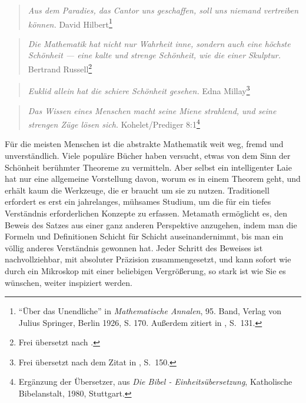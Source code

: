\begin{quote}
  {\em Aus dem Paradies, das Cantor uns geschaffen, soll uns niemand vertreiben können.}
   \flushright\sc  David Hilbert\footnote{"`Über das Unendliche"' in {\em Mathematische Annalen}, 95. Band, Verlag von Julius Springer, Berlin 1926, S. 170. Außerdem zitiert in \cite{Moore}, S.~131.}\\
\end{quote}

\begin{quote}
  {\em Die Mathematik hat nicht nur Wahrheit inne, sondern auch eine höchste Schönheit --- eine kalte und strenge Schönheit, wie die einer Skulptur.}
    \flushright\sc  Bertrand Russell\footnote{Frei übersetzt nach \cite{Russell}.}\\
\end{quote}

\begin{quote}
  {\em Euklid allein hat die schiere Schönheit gesehen.}
  \flushright\sc Edna Millay\footnote{Frei übersetzt nach dem Zitat in \cite{Davis}, S.~150.}\\
\end{quote}

\begin{quote}
	{\em Das Wissen eines Menschen macht seine Miene strahlend, und seine strengen Züge lösen sich.}
	\flushright\sc Kohelet/Prediger 8:1\footnote{Ergänzung der Übersetzer, aus {\em Die Bibel - Einheitsübersetzung}, Katholische Bibelanstalt, 1980, Stuttgart.}\\
\end{quote}

Für die meisten Menschen ist die abstrakte Mathematik weit weg, fremd und unverständlich.  Viele populäre Bücher haben versucht, etwas von dem Sinn der Schönheit berühmter Theoreme zu vermitteln.  Aber selbst ein intelligenter Laie hat nur eine allgemeine Vorstellung davon, worum es in einem Theorem geht, und erhält kaum die Werkzeuge, die er braucht um sie zu nutzen.  Traditionell erfordert es erst ein jahrelanges, mühsames Studium, um die für ein tiefes Verständnis erforderlichen Konzepte zu erfassen.
Metamath ermöglicht es, den Beweis des Satzes aus einer ganz anderen Perspektive anzugehen, indem man die Formeln und Definitionen Schicht für Schicht auseinandernimmt, bis man ein völlig anderes Verständnis gewonnen hat.
Jeder Schritt des Beweises ist nachvollziehbar, mit absoluter Präzision zusammengesetzt, und kann sofort wie durch ein Mikroskop mit einer beliebigen Vergrößerung, so stark ist wie Sie es wünschen, weiter inspiziert werden.

